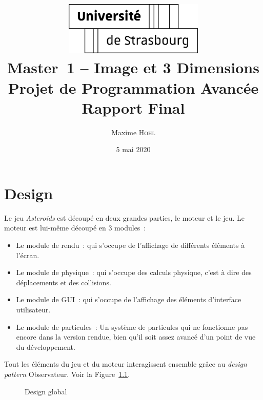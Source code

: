 \documentclass[10pt, french, a4paper]{report}
\title{
	\includegraphics[width=0.5\textwidth]{logo-uds.pdf}\\
	\vspace{2em}
	Master~1 -- Image et 3 Dimensions\\
	Projet de Programmation Avancée\\
	Rapport Final
}
\author{Maxime \textsc{Hohl}}
\date{5 mai 2020}
\begin{document}
\maketitle

\tableofcontents

\chapter{Design}

Le jeu \textit{Asteroids} est découpé en deux grandes parties, le moteur et le jeu. 
Le moteur est lui-même découpé en 3 modules~:
\begin{itemize}
	\item Le module de rendu~: qui s'occupe de l'affichage de différents éléments à
	      l'écran.
	\item Le module de physique~: qui s'occupe des calculs physique, c'est à dire des
	      déplacements et des collisions.
	\item Le module de GUI~: qui s'occupe de l'affichage des éléments d'interface
	      utilisateur.
	\item Le module de particules~: Un système de particules qui ne fonctionne pas encore 
	      dans la version rendue, bien qu'il soit assez avancé d'un point de vue du 
	      développement.
\end{itemize}

Tout les éléments du jeu et du moteur interagissent ensemble grâce au \textit{design pattern} Observateur. Voir la Figure~\ref{fig:design-global}.

\begin{figure}[h]
	\center
	\caption{Design global}
	\label{fig:design-global}
\end{figure}
\end{document}
